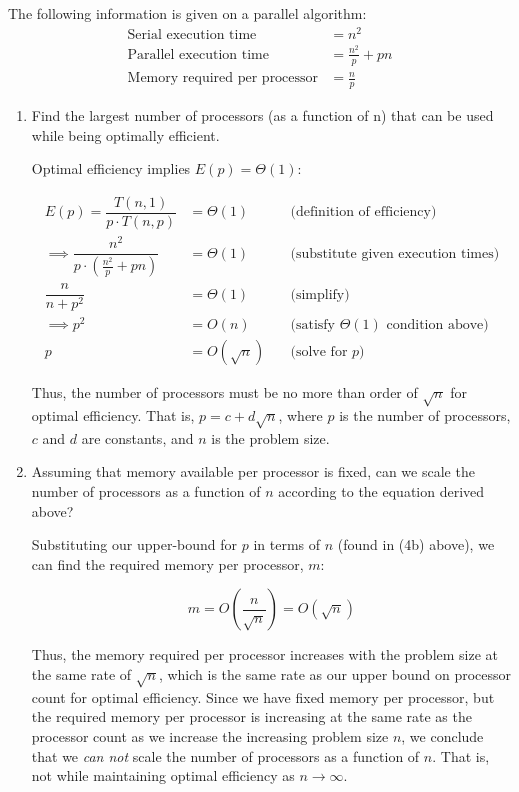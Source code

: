 \documentclass[twoside,10pt]{article}
\newcommand{\eqn}[1]{\begin{equation*}#1\end{equation*}}
\newcommand{\aln}[1]{\begin{align*}#1\end{align*}}
\begin{document}
\section{}

The following information is given on a parallel algorithm:
\aln{
  \text{Serial execution time} &= n^2\\
  \text{Parallel execution time} &= \frac{n^2}{p} + pn\\
  \text{Memory required per processor} &= \frac{n}{p}
}

\begin{enumerate}[label=(\alph*)]
\item Find the largest number of processors (as a function of n) that can be used while being optimally efficient.

\quad Optimal efficiency implies $E(p) = \Theta(1)$:

\aln{
  E(p) = \dfrac{T(n,1)}{p \cdot T(n, p)} &= \Theta(1) &\quad \text{(definition of efficiency)}\\
  \implies \dfrac{n^2}{p \cdot \left(\frac{n^2}{p} + pn\right)} &= \Theta(1) &\quad \text{(substitute given execution times)}\\
  \dfrac{n}{n + p^2} &= \Theta(1) &\quad \text{(simplify)}\\
  \implies p^2 &= O(n) &\quad \text{(satisfy $\Theta(1)$ condition above)}\\
  p &= O(\sqrt{n}) &\quad \text{(solve for $p$)}
}

\quad Thus, the number of processors must be no more than order of $\sqrt{n}$ for optimal efficiency.
That is, $p = c + d\sqrt{n}$, where $p$ is the number of processors, $c$ and $d$ are constants, and $n$ is the problem size.

\item Assuming that memory available per processor is fixed, can we scale the number of processors as a function of $n$ according to the equation derived above?

\quad Substituting our upper-bound for $p$ in terms of $n$ (found in (4b) above), we can find the required memory per processor, $m$:

\eqn{m = O\left(\dfrac{n}{\sqrt{n}}\right) = O(\sqrt{n})}

\quad Thus, the memory required per processor increases with the problem size at the same rate of $\sqrt{n}$, which is the same rate as our upper bound on processor count for optimal efficiency.
Since we have fixed memory per processor, but the required memory per processor is increasing at the same rate as the processor count as we increase the increasing problem size $n$, we conclude that we \textit{can not} scale the number of processors as a function of $n$.
That is, not while maintaining optimal efficiency as $n \to \infty$.

\quad 

\end{enumerate}
\end{document}

